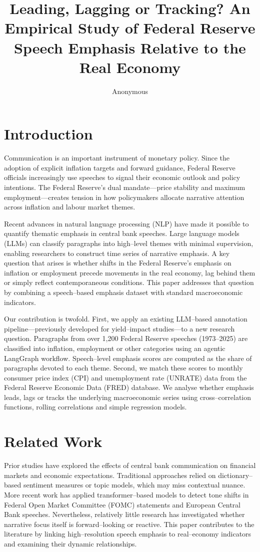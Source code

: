 \documentclass[sigconf]{acmart}
\title{Leading, Lagging or Tracking? \newline An Empirical Study of Federal Reserve Speech Emphasis Relative to the Real Economy}
\author{Anonymous}
\affiliation{\institution{Institution Name}\country{}}
\begin{document}
\maketitle

\section{Introduction}

Communication is an important instrument of monetary policy.  Since the adoption of explicit inflation targets and forward guidance, Federal Reserve officials increasingly use speeches to signal their economic outlook and policy intentions.  The Federal Reserve’s dual mandate—price stability and maximum employment—creates tension in how policymakers allocate narrative attention across inflation and labour market themes.  

Recent advances in natural language processing (NLP) have made it possible to quantify thematic emphasis in central bank speeches.  Large language models (LLMs) can classify paragraphs into high–level themes with minimal supervision, enabling researchers to construct time series of narrative emphasis.  A key question that arises is whether shifts in the Federal Reserve’s emphasis on inflation or employment precede movements in the real economy, lag behind them or simply reflect contemporaneous conditions.  This paper addresses that question by combining a speech–based emphasis dataset with standard macroeconomic indicators.

Our contribution is twofold.  First, we apply an existing LLM–based annotation pipeline—previously developed for yield–impact studies—to a new research question.  Paragraphs from over 1,200 Federal Reserve speeches (1973–2025) are classified into inflation, employment or other categories using an agentic LangGraph workflow.  Speech–level emphasis scores are computed as the share of paragraphs devoted to each theme.  Second, we match these scores to monthly consumer price index (CPI) and unemployment rate (UNRATE) data from the Federal Reserve Economic Data (FRED) database.  We analyse whether emphasis leads, lags or tracks the underlying macroeconomic series using cross–correlation functions, rolling correlations and simple regression models.

\section{Related Work}
Prior studies have explored the effects of central bank communication on financial markets and economic expectations\cite{ref1,ref2}.  Traditional approaches relied on dictionary–based sentiment measures or topic models\cite{ref3}, which may miss contextual nuance.  More recent work has applied transformer–based models to detect tone shifts in Federal Open Market Committee (FOMC) statements and European Central Bank speeches\cite{ref4}.  Nevertheless, relatively little research has investigated whether narrative focus itself is forward–looking or reactive.  This paper contributes to the literature by linking high–resolution speech emphasis to real–economy indicators and examining their dynamic relationships.
\end{document}
